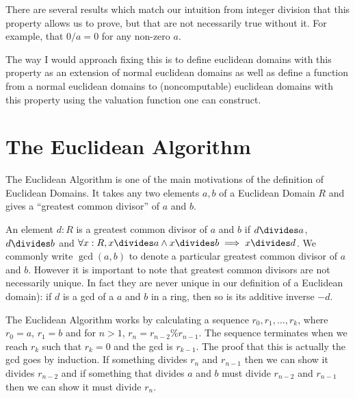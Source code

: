 \documentclass{article}
\begin{document}
There are several results which match our intuition from integer division that this property allows us to prove, but that are not necessarily true without it.
For example, that $0/a=0$ for any non-zero $a$.

The way I would approach fixing this is to define euclidean domains with this property as an extension of normal euclidean domains as well as define a function from a normal euclidean domains to (noncomputable) euclidean domains with this property using the valuation function one can construct.



\section{The Euclidean Algorithm}

The Euclidean Algorithm is one of the main motivations of the definition of Euclidean Domains. 
It takes any two elements $a,b$ of a Euclidean Domain $R$ and gives a ``greatest common divisor'' of $a$ and $b$. 

An element $d : R$ is a greatest common divisor of $a$ and $b$ if $d \divides a$, $d \divides b$ and $\forall x : R, x \divides a \land x \divides b \implies x \divides d$.
We commonly write $\gcd(a,b)$ to denote a particular greatest common divisor of $a$ and $b$.
However it is important to note that greatest common divisors are not necessarily unique. In fact they are never unique in our definition of a Euclidean domain): if $d$ is a gcd of a $a$ and $b$ in a ring, then so is its additive inverse $-d$.

The Euclidean Algorithm works by calculating a sequence $r_0,r_1,\ldots,r_k$, where $r_0=a$, $r_1=b$ and for $n>1$, $r_n=r_{n-2}\%r_{n-1}$.
The sequence terminates when we reach $r_k$ such that $r_k=0$ and the gcd is $r_{k-1}$.
The proof that this is actually the gcd goes by induction. 
If something divides $r_n$ and $r_{n-1}$ then we can show it divides $r_{n-2}$ and if something that divides $a$ and $b$ must divide $r_{n-2}$ and $r_{n-1}$ then we can show it must divide $r_n$.
\end{document}
